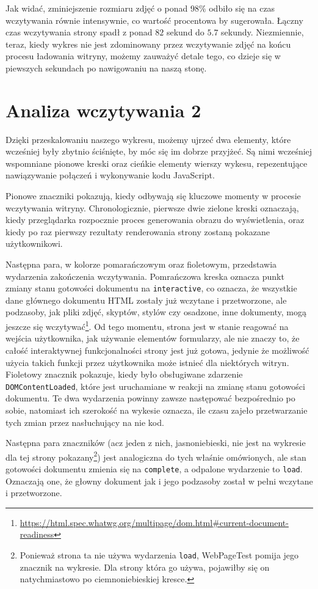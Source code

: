 \documentclass[licencjacka]{pracadypl}
\begin{document}
Jak widać, zminiejszenie rozmiaru zdjęć o ponad $98\%$ odbiło się na czas wczytywania równie intensywnie, co wartość procentowa by sugerowała. Łączny czas wczytywania strony spadł z ponad $82$ sekund do $5.7$ sekundy. Niezmiennie, teraz, kiedy wykres nie jest zdominowany przez wczytywanie zdjęć na końcu procesu ładowania witryny, możemy zauważyć detale tego, co dzieje się w piewszych sekundach po nawigowaniu na naszą stonę.

\section{Analiza wczytywania 2}
Dzięki przeskalowaniu naszego wykresu, możemy ujrzeć dwa elementy, które wcześniej były zbytnio ściśnięte, by móc się im dobrze przyjżeć. Są nimi wcześniej wspomniane pionowe kreski oraz cieńkie elementy wierszy wykesu, repezentujące nawiązywanie połączeń i wykonywanie kodu JavaScript.

Pionowe znaczniki pokazują, kiedy odbywają się kluczowe momenty w procesie wczytywania witryny. Chronologicznie, pierwsze dwie zielone kreski oznaczają, kiedy przeglądarka rozpocznie proces generowania obrazu do wyświetlenia, oraz kiedy po raz pierwszy rezultaty renderowania strony zostaną pokazane użytkownikowi. 

Następna para, w kolorze pomarańczowym oraz fioletowym, przedstawia wydarzenia zakończenia wczytywania. Pomrańczowa kreska oznacza punkt zmiany stanu gotowości dokumentu na \verb|interactive|, co oznacza, że wszystkie dane głównego dokumentu HTML zostały już wczytane i przetworzone, ale podzasoby, jak pliki zdjęć, skyptów, stylów czy osadzone, inne dokumenty, mogą jeszcze się wczytywać\footnote{\url{https://html.spec.whatwg.org/multipage/dom.html\#current-document-readiness}}. Od tego momentu, strona jest w stanie reagować na wejścia użytkownika, jak używanie elementów formularzy, ale nie znaczy to, że całość interaktywnej funkcjonalności strony jest już gotowa, jedynie że możliwość użycia takich funkcji przez użytkownika może istnieć dla niektórych witryn. Fioletowy znacznik pokazuje, kiedy było obsługiwane zdarzenie \verb|DOMContentLoaded|, które jest uruchamiane w reakcji na zmianę stanu gotowości dokumentu. Te dwa wydarzenia powinny zawsze następować bezpośrednio po sobie, natomiast ich szerokość na wykesie oznacza, ile czasu zajeło przetwarzanie tych zmian przez nasłuchujący na nie kod.

Następna para znaczników (acz jeden z nich, jasnoniebieski, nie jest na wykresie dla tej strony pokazany\footnote{Ponieważ strona ta nie używa wydarzenia \texttt{load}, WebPageTest pomija jego znacznik na wykresie. Dla strony która go używa, pojawiłby się on natychmiastowo po ciemnoniebieskiej kresce.}) jest analogiczna do tych właśnie omówionych, ale stan gotowości dokumentu zmienia się na \texttt{complete}, a odpalone wydarzenie to \texttt{load}. Oznaczają one, że głowny dokument jak i jego podzasoby został w pełni wczytane i przetworzone. 
\end{document}
